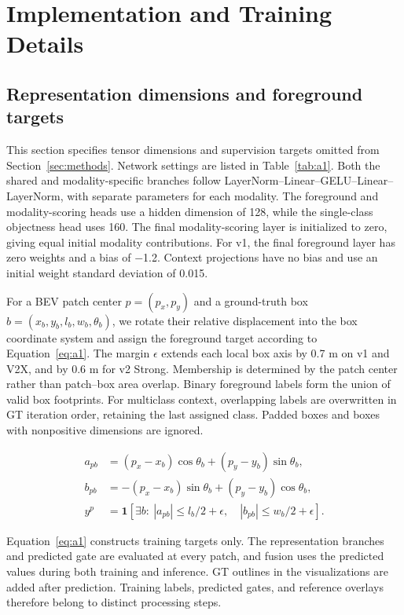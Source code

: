 \section{Implementation and Training Details}
\label{app:a}

\subsection{Representation dimensions and foreground targets}
\label{subsec:a1}

This section specifies tensor dimensions and supervision targets omitted from Section~\ref{sec:methods}. Network settings are listed in Table~\ref{tab:a1}. Both the shared and modality-specific branches follow LayerNorm--Linear--GELU--Linear--LayerNorm, with separate parameters for each modality. The foreground and modality-scoring heads use a hidden dimension of 128, while the single-class objectness head uses 160. The final modality-scoring layer is initialized to zero, giving equal initial modality contributions. For v1, the final foreground layer has zero weights and a bias of \(-\)1.2. Context projections have no bias and use an initial weight standard deviation of 0.015.

For a BEV patch center \(p=(p_x,p_y)\) and a ground-truth box \(b=(x_b,y_b,l_b,w_b,\theta_b)\), we rotate their relative displacement into the box coordinate system and assign the foreground target according to Equation~\eqref{eq:a1}. The margin \(\epsilon\) extends each local box axis by 0.7 m on v1 and V2X, and by 0.6 m for v2 Strong. Membership is determined by the patch center rather than patch--box area overlap. Binary foreground labels form the union of valid box footprints. For multiclass context, overlapping labels are overwritten in GT iteration order, retaining the last assigned class. Padded boxes and boxes with nonpositive dimensions are ignored.

\begin{equation}
\begin{aligned}
a_{pb}&=(p_x-x_b)\cos\theta_b+(p_y-y_b)\sin\theta_b,\\
b_{pb}&=-(p_x-x_b)\sin\theta_b+(p_y-y_b)\cos\theta_b,\\
y^p&=\mathbf{1}\!\left[\exists b:\ |a_{pb}|\le l_b/2+\epsilon,\quad |b_{pb}|\le w_b/2+\epsilon\right].
\end{aligned}
\label{eq:a1}
\end{equation}

Equation~\eqref{eq:a1} constructs training targets only. The representation branches and predicted gate are evaluated at every patch, and fusion uses the predicted values during both training and inference. GT outlines in the visualizations are added after prediction. Training labels, predicted gates, and reference overlays therefore belong to distinct processing steps.

